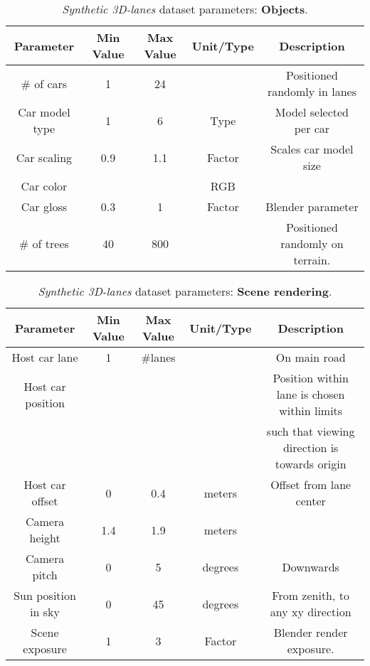 \documentclass[10pt,twocolumn,letterpaper]{article}
\begin{document}
\begin{table*}[h]
	\centering
	\caption{\emph{Synthetic 3D-lanes} dataset parameters: \textbf{Objects}.}
	\begin{tabular} {*5c}
		\toprule
		\textbf{Parameter} &  \textbf{Min Value} &  \textbf{Max Value} & \textbf{Unit/Type} & \textbf{Description}  \\
		\toprule		
		\# of cars & 1 & 24 & & Positioned randomly in lanes\\
		\midrule
		Car model type & 1 & 6 & Type & Model selected per car\\
		\midrule
		Car scaling & 0.9 & 1.1 & Factor & Scales car model size\\
		\midrule
		Car color &  &  & RGB & \\
		\midrule
		Car gloss & 0.3 & 1 & Factor & Blender parameter\\
		\midrule
		\# of trees & 40 & 800 & & Positioned randomly on terrain.\\
		\bottomrule
		
	\end{tabular} 
	\label{tab:real}
\end{table*}

\begin{table*}[h]
	\centering
	\caption{\emph{Synthetic 3D-lanes} dataset parameters: \textbf{Scene rendering}.}
	\begin{tabular} {*5c}
		\toprule
		\textbf{Parameter} &  \textbf{Min Value} &  \textbf{Max Value} & \textbf{Unit/Type} & \textbf{Description}  \\
		\toprule		
		Host car lane & 1 & \#lanes & & On main road\\
		\midrule
		Host car position &  &  & & Position within lane is chosen within limits\\
		& & & & such that viewing direction is towards origin\\
		\midrule
		Host car offset & 0 & 0.4 & meters & Offset from lane center\\
		\midrule
		Camera height& 1.4 & 1.9 & meters & \\
		\midrule
		Camera pitch& 0 & 5 & degrees & Downwards\\
		\midrule
		Sun position in sky & 0 & 45 &  degrees & From zenith, to any xy direction\\
		\midrule
		Scene exposure & 1  & 3 & Factor  & Blender render exposure.\\
		\bottomrule
	\end{tabular} 
	\label{tab:params_last}
\end{table*}
\end{document}
